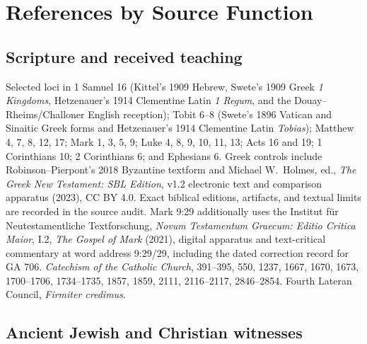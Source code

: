\section{References by Source Function}

\subsection{Scripture and received teaching}

Selected loci in 1 Samuel 16 (Kittel's 1909 Hebrew, Swete's 1909 Greek
\emph{1 Kingdoms}, Hetzenauer's 1914 Clementine Latin \emph{1 Regum}, and
the Douay--Rheims/Challoner English reception); Tobit 6--8 (Swete's 1896
Vatican and Sinaitic Greek forms and Hetzenauer's 1914 Clementine Latin
\emph{Tobias}); Matthew 4, 7, 8, 12, 17; Mark 1, 3,
5, 9; Luke 4, 8, 9, 10, 11, 13; Acts 16 and 19; 1 Corinthians 10;
2 Corinthians 6; and Ephesians 6. Greek controls include
Robinson--Pierpont's 2018 Byzantine textform and Michael W.\ Holmes, ed.,
\emph{The Greek New Testament: SBL Edition}, v1.2 electronic text and
comparison apparatus (2023), CC BY 4.0. Exact biblical editions, artifacts,
and textual limits are recorded in the source audit. Mark 9:29 additionally
uses the Institut für Neutestamentliche Textforschung,
\emph{Novum Testamentum Graecum: Editio Critica Maior}, I.2,
\emph{The Gospel of Mark} (2021), digital apparatus and text-critical
commentary at word address 9:29/29, including the dated correction record for
GA 706. \emph{Catechism of the Catholic
Church}, 391--395, 550, 1237, 1667, 1670, 1673, 1700--1706, 1734--1735,
1857, 1859, 2111, 2116--2117, 2846--2854. Fourth Lateran Council,
\emph{Firmiter credimus}.

\subsection{Ancient Jewish and Christian witnesses}

